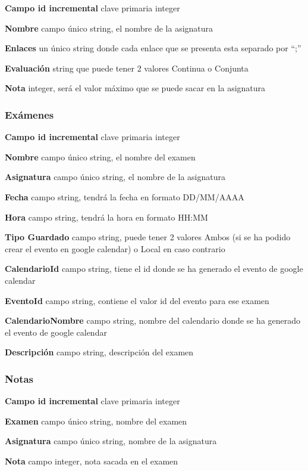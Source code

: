 \textbf{Campo id incremental} clave primaria integer

\textbf{Nombre} campo único string, el nombre de la asignatura

\textbf{Enlaces}   un único string donde cada enlace que se presenta esta separado por “;”

\textbf{Evaluación} string que puede tener 2 valores Continua o Conjunta

\textbf{Nota} integer, será el valor máximo que se puede sacar en la asignatura

\subsubsection{Exámenes}
\label{subsubsecc:Exámenes}


\textbf{Campo id incremental} clave primaria integer

\textbf{Nombre} campo único string, el nombre del examen

\textbf{Asignatura} campo único string, el nombre de la asignatura

\textbf{Fecha} campo string, tendrá la fecha en formato DD/MM/AAAA

\textbf{Hora} campo string, tendrá la hora en formato HH:MM

\textbf{Tipo Guardado} campo string, puede tener 2 valores Ambos (si se ha podido crear el evento en google calendar) o Local  en caso contrario

\textbf{CalendarioId} campo string, tiene el id donde se ha generado el evento de google calendar

\textbf{EventoId} campo string, contiene el valor id del evento para ese examen

\textbf{CalendarioNombre} campo string, nombre del calendario donde se ha generado el evento de google calendar

\textbf{Descripción} campo string, descripción del examen

\subsubsection{Notas}
\label{subsubsecc:Notas}


\textbf{Campo id incremental} clave primaria integer

\textbf{Examen} campo único string, nombre del examen

\textbf{Asignatura} campo único string, nombre de la asignatura

\textbf{Nota} campo integer, nota sacada en el examen

